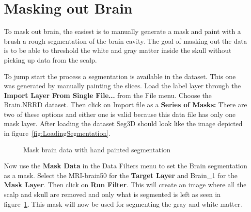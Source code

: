 \documentclass[fleqn,11pt,openany]{book}
\begin{document}
\section{Masking out Brain}

To mask out brain, the easiest is to manually generate a mask and paint with a brush a rough segmentation of the brain cavity. The goal of masking out the data is to be able to threshold the white and gray matter inside the skull without picking up data from the scalp.

To jump start the process a segmentation is available in the dataset. This one was generated by manually painting the slices. Load the label layer through the {\bf Import Layer From Single File...} from the  File menu. Choose the Brain.NRRD dataset.  Then click on Import file as a {\bf Series of Masks:} There are two of these options and either one is valid because this data file has only one mask layer.  After loading the dataset Seg3D should look like the image depicted in figure~\ref{fig:LoadingSegmentation}.

\begin{figure}
\caption{Mask brain data with hand painted segmentation}\label{fig:MaskDataBrain}
\end{figure}

Now use the {\bf Mask Data} in the Data Filters menu to set the  Brain segmentation as a mask. Select the MRI-brain50 for the {\bf Target Layer} and Brain\_1 for the {\bf Mask Layer}. Then click on {\bf Run Filter}. This will create an image where all the scalp and skull are removed and only what is segmented is left as seen in figure~\ref{fig:MaskDataBrain}. This mask will now be used for segmenting the gray and white matter.
\end{document}

